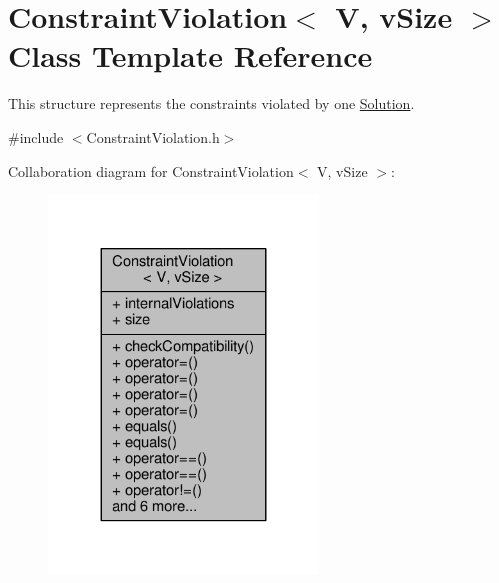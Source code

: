 \hypertarget{structConstraintViolation}{}\section{Constraint\+Violation$<$ V, v\+Size $>$ Class Template Reference}
\label{structConstraintViolation}


This structure represents the constraints violated by one \hyperlink{classSolution}{Solution}.  




{\ttfamily \#include $<$Constraint\+Violation.\+h$>$}



Collaboration diagram for Constraint\+Violation$<$ V, v\+Size $>$\+:\nopagebreak
\begin{figure}[H]
\begin{center}
\leavevmode
\includegraphics[width=203pt]{structConstraintViolation__coll__graph}
\end{center}
\end{figure}
